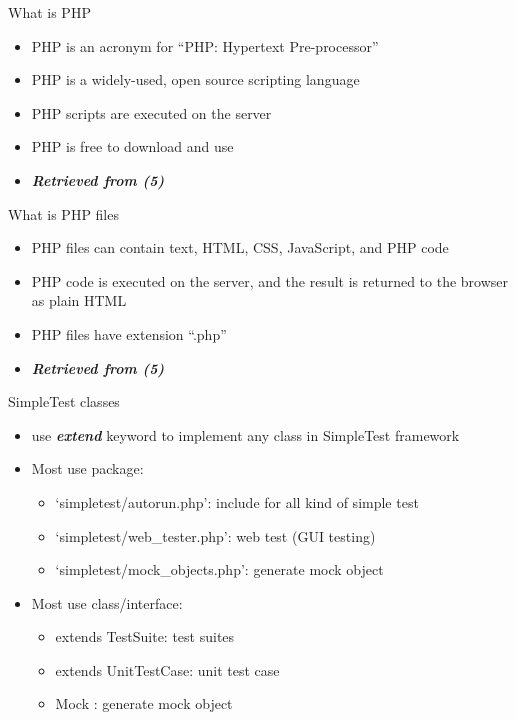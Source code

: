 \documentclass[
  ignorenonframetext,
]{beamer}
\providecommand{\tightlist}{%
  \setlength{\itemsep}{0pt}\setlength{\parskip}{0pt}}
\begin{document}
\begin{frame}{What is PHP}
\protect\hypertarget{what-is-php}{}
\begin{itemize}
\tightlist
\item
  PHP is an acronym for ``PHP: Hypertext Pre-processor''
\item
  PHP is a widely-used, open source scripting language
\item
  PHP scripts are executed on the server
\item
  PHP is free to download and use
\item
  \emph{\textbf{Retrieved from (5)}}
\end{itemize}
\end{frame}

\begin{frame}{What is PHP files}
\protect\hypertarget{what-is-php-files}{}
\begin{itemize}
\tightlist
\item
  PHP files can contain text, HTML, CSS, JavaScript, and PHP code
\item
  PHP code is executed on the server, and the result is returned to the
  browser as plain HTML
\item
  PHP files have extension ``.php''
\item
  \emph{\textbf{Retrieved from (5)}}
\end{itemize}
\end{frame}

\begin{frame}{SimpleTest classes}
\protect\hypertarget{simpletest-classes}{}
\begin{itemize}
\tightlist
\item
  use \emph{\textbf{extend}} keyword to implement any class in
  SimpleTest framework
\item
  Most use package:

  \begin{itemize}
  \tightlist
  \item
    `simpletest/autorun.php': include for all kind of simple test
  \item
    `simpletest/web\_tester.php': web test (GUI testing)
  \item
    `simpletest/mock\_objects.php': generate mock object
  \end{itemize}
\item
  Most use class/interface:

  \begin{itemize}
  \tightlist
  \item
    extends TestSuite: test suites
  \item
    extends UnitTestCase: unit test case
  \item
    Mock : generate mock object
  \end{itemize}
\end{itemize}
\end{frame}
\end{document}
